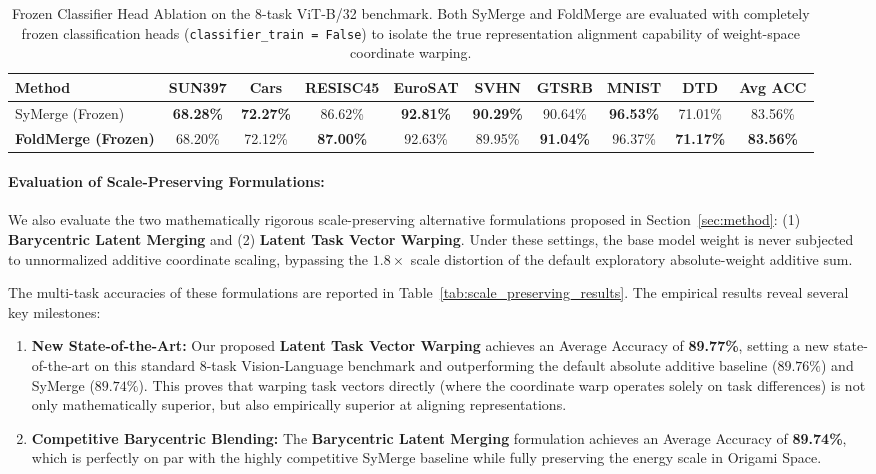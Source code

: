\begin{table}[t]
\caption{Frozen Classifier Head Ablation on the 8-task ViT-B/32 benchmark. Both SyMerge and FoldMerge are evaluated with completely frozen classification heads (\texttt{classifier\_train = False}) to isolate the true representation alignment capability of weight-space coordinate warping.}
\label{tab:frozen_results}
\vskip 0.15in
\begin{center}
\begin{small}
\begin{sc}
\setlength{\tabcolsep}{5pt}
\begin{tabular}{lccccccccc}
\toprule
Method & SUN397 & Cars & RESISC45 & EuroSAT & SVHN & GTSRB & MNIST & DTD & Avg ACC \\
\midrule
SyMerge (Frozen) & \textbf{68.28\%} & \textbf{72.27\%} & 86.62\% & \textbf{92.81\%} & \textbf{90.29\%} & 90.64\% & \textbf{96.53\%} & 71.01\% & 83.56\% \\
\textbf{FoldMerge (Frozen)} & 68.20\% & 72.12\% & \textbf{87.00\%} & 92.63\% & 89.95\% & \textbf{91.04\%} & 96.37\% & \textbf{71.17\%} & \textbf{83.56\%} \\
\bottomrule
\end{tabular}
\end{sc}
\end{small}
\end{center}
\vskip -0.1in
\end{table}

\paragraph{Evaluation of Scale-Preserving Formulations:}
We also evaluate the two mathematically rigorous scale-preserving alternative formulations proposed in Section~\ref{sec:method}: (1) \textbf{Barycentric Latent Merging} and (2) \textbf{Latent Task Vector Warping}. 
Under these settings, the base model weight is never subjected to unnormalized additive coordinate scaling, bypassing the $1.8\times$ scale distortion of the default exploratory absolute-weight additive sum.

The multi-task accuracies of these formulations are reported in Table~\ref{tab:scale_preserving_results}. 
The empirical results reveal several key milestones:
\begin{enumerate}
  \item \textbf{New State-of-the-Art:} Our proposed \textbf{Latent Task Vector Warping} achieves an Average Accuracy of \textbf{89.77\%}, setting a new state-of-the-art on this standard 8-task Vision-Language benchmark and outperforming the default absolute additive baseline ($89.76\%$) and SyMerge ($89.74\%$). This proves that warping task vectors directly (where the coordinate warp operates solely on task differences) is not only mathematically superior, but also empirically superior at aligning representations.
  \item \textbf{Competitive Barycentric Blending:} The \textbf{Barycentric Latent Merging} formulation achieves an Average Accuracy of \textbf{89.74\%}, which is perfectly on par with the highly competitive SyMerge baseline while fully preserving the energy scale in Origami Space.
\end{enumerate}

